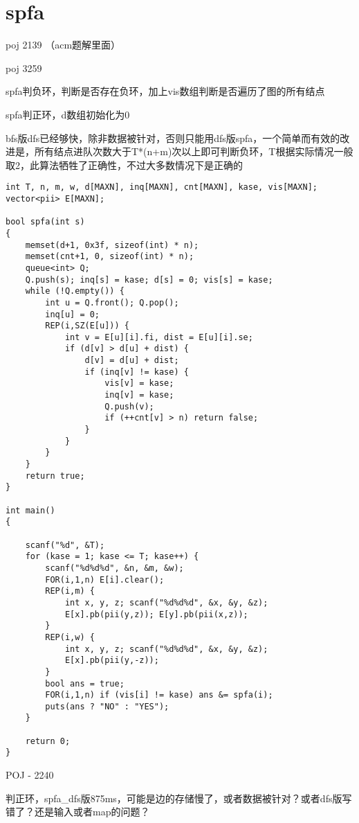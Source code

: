 \section{spfa}

poj 2139 （acm题解里面）

poj 3259

spfa判负环，判断是否存在负环，加上vis数组判断是否遍历了图的所有结点

spfa判正环，d数组初始化为0

bfs版dfs已经够快，除非数据被针对，否则只能用dfs版spfa，一个简单而有效的改进是，所有结点进队次数大于T*(n+m)次以上即可判断负环，T根据实际情况一般取2，此算法牺牲了正确性，不过大多数情况下是正确的

\begin{lstlisting}
int T, n, m, w, d[MAXN], inq[MAXN], cnt[MAXN], kase, vis[MAXN];
vector<pii> E[MAXN];

bool spfa(int s)
{
    memset(d+1, 0x3f, sizeof(int) * n);
    memset(cnt+1, 0, sizeof(int) * n);
    queue<int> Q;
    Q.push(s); inq[s] = kase; d[s] = 0; vis[s] = kase;
    while (!Q.empty()) {
        int u = Q.front(); Q.pop();
        inq[u] = 0;
        REP(i,SZ(E[u])) {
            int v = E[u][i].fi, dist = E[u][i].se;
            if (d[v] > d[u] + dist) {
                d[v] = d[u] + dist;
                if (inq[v] != kase) {
                    vis[v] = kase;
                    inq[v] = kase;
                    Q.push(v);
                    if (++cnt[v] > n) return false;
                }
            }
        }
    }
    return true;
}

int main()
{

    scanf("%d", &T);
    for (kase = 1; kase <= T; kase++) {
        scanf("%d%d%d", &n, &m, &w);
        FOR(i,1,n) E[i].clear();
        REP(i,m) {
            int x, y, z; scanf("%d%d%d", &x, &y, &z);
            E[x].pb(pii(y,z)); E[y].pb(pii(x,z));
        }
        REP(i,w) {
            int x, y, z; scanf("%d%d%d", &x, &y, &z);
            E[x].pb(pii(y,-z));
        }
        bool ans = true;
        FOR(i,1,n) if (vis[i] != kase) ans &= spfa(i);
        puts(ans ? "NO" : "YES");
    }

    return 0;
}
\end{lstlisting}

POJ - 2240

判正环，spfa\_dfs版875ms，可能是边的存储慢了，或者数据被针对？或者dfs版写错了？还是输入或者map的问题？

